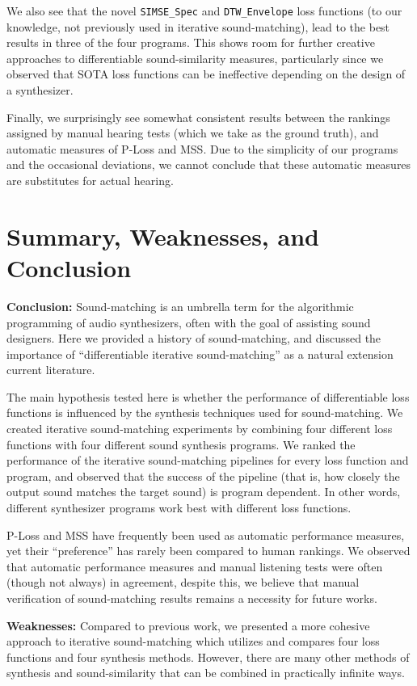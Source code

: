 \documentclass[lettersize,journal]{IEEEtran}
\newcommand{\SIMSESpec}{\texttt{SIMSE\_Spec}}
\newcommand{\DTWEnv}{\texttt{DTW\_Envelope}}
\begin{document}
We also see that the novel \SIMSESpec{} and \DTWEnv{} loss functions (to our knowledge, not previously used in iterative sound-matching), lead to the best results in three of the four programs. This shows room for further creative approaches to differentiable sound-similarity measures, particularly since we observed that SOTA loss functions can be ineffective depending on the design of a synthesizer. 

Finally, we surprisingly see somewhat consistent results between the rankings assigned by manual hearing tests (which we take as the ground truth), and automatic measures of P-Loss and MSS. Due to the simplicity of our programs and the occasional deviations, we cannot conclude that these automatic measures are substitutes for actual hearing.


\section{Summary, Weaknesses, and Conclusion}
\label{sec:summary_conclusion}
\textbf{Conclusion:} Sound-matching is an umbrella term for the algorithmic programming of audio synthesizers, often with the goal of assisting sound designers. Here we provided a history of sound-matching, and discussed the importance of ``differentiable iterative sound-matching'' as a natural extension current literature.


The main hypothesis tested here is whether the performance of differentiable loss functions is influenced by the synthesis techniques used for sound-matching. We created iterative sound-matching experiments by combining four different loss functions with four different sound synthesis programs. We ranked the performance of the iterative sound-matching pipelines for every loss function and program, and observed that the success of the pipeline (that is, how closely the output sound matches the target sound) is program dependent. In other words, different synthesizer programs work best with different loss functions. 

P-Loss and MSS have frequently been used as automatic performance measures, yet their ``preference'' has rarely been compared to human rankings. We observed that automatic performance measures and manual listening tests were often (though not always) in agreement, despite this, we believe that manual verification of sound-matching results remains a necessity for future works.  

\textbf{Weaknesses:} Compared to previous work, we presented a more cohesive approach to iterative sound-matching which utilizes and compares four loss functions and four synthesis methods. However, there are many other methods of synthesis and sound-similarity that can be combined in practically infinite ways. 
\end{document}
